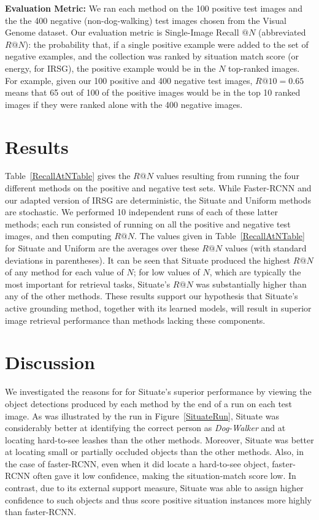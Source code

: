 \documentclass[conference]{IEEEtran}
\begin{document}
{\bf Evaluation Metric:} We ran each method on the 100 positive test images and the the 400
negative (non-dog-walking) test images chosen from the Visual Genome
dataset.  Our evaluation metric is Single-Image Recall $@ N$
(abbreviated $R@N$): the probability that, if a single positive
example were added to the set of negative examples, and the collection
was ranked by situation match score (or energy, for IRSG), the
positive example would be in the $N$ top-ranked images.  For example,
given our 100 positive and 400 negative test images, $R@10=0.65$ means
that 65 out of 100 of the positive images would be in the top 10
ranked images if they were ranked alone with the 400 negative images.


\section{Results \label{results}}

Table~\ref{RecallAtNTable} gives the $R@N$ values resulting from
running the four different methods on the positive and negative test sets. 
While Faster-RCNN and our adapted version of IRSG are deterministic,
the Situate and Uniform methods are stochastic.  We performed 10
independent runs of each of these latter methods; each run consisted of running on all
the positive and negative test images, and then computing $R@N$.  The
values given in Table~\ref{RecallAtNTable} for Situate and Uniform are
the averages over these $R@N$ values (with standard deviations in
parentheses).  It can be seen that Situate produced the highest $R@N$ of
any method for each value of $N$; for low values of $N$, which are
typically the most important for retrieval tasks, Situate's $R@N$ was
substantially higher than any of the other methods.  These results support
our hypothesis that Situate's active grounding method,
together with its learned models, will result in superior image
retrieval performance than methods lacking these components.

\section{Discussion}

We investigated the reasons for for Situate's superior performance by
viewing the object detections produced by each method by the end of a
run on each test image.  As was illustrated by the run in Figure~\ref{SituateRun}, Situate was
considerably better at identifying the correct person as {\it
  Dog-Walker} and at locating hard-to-see leashes than the other
methods.  Moreover, Situate was better at locating small or partially
occluded objects than the other methods.  Also, in the case of
faster-RCNN, even when it did locate a hard-to-see object, faster-RCNN often
gave it low confidence, making the situation-match score low.  In
contrast, due to its external support measure, Situate was able to
assign higher confidence to such objects and thus score positive
situation instances more highly than faster-RCNN.
\end{document}
